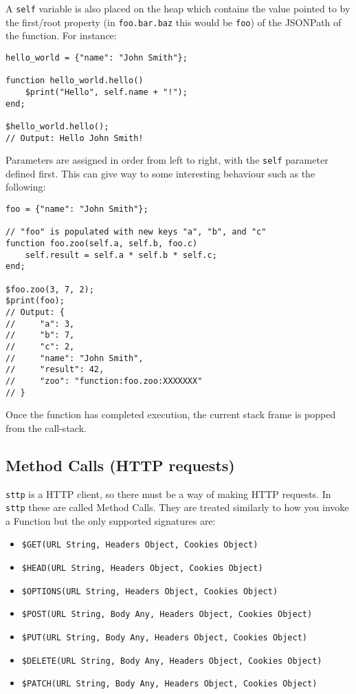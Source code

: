 A \verb|self| variable is also placed on the heap which contains the value pointed to by the first/root property (in \verb|foo.bar.baz| this would be \verb|foo|) of the JSONPath of the function. For instance:

\begin{verbatim}
hello_world = {"name": "John Smith"};

function hello_world.hello()
    $print("Hello", self.name + "!");
end;

$hello_world.hello();
// Output: Hello John Smith!
\end{verbatim}

Parameters are assigned in order from left to right, with the \verb|self| parameter defined first. This can give way to some interesting behaviour such as the following:

\begin{verbatim}
foo = {"name": "John Smith"};

// "foo" is populated with new keys "a", "b", and "c"
function foo.zoo(self.a, self.b, foo.c)
    self.result = self.a * self.b * self.c;
end;

$foo.zoo(3, 7, 2);
$print(foo);
// Output: {
//     "a": 3,
//     "b": 7,
//     "c": 2,
//     "name": "John Smith",
//     "result": 42,
//     "zoo": "function:foo.zoo:XXXXXXX"
// }
\end{verbatim}

Once the function has completed execution, the current stack frame is popped from the call-stack.

\subsection{Method Calls (HTTP requests)}

\verb|sttp| is a HTTP client, so there must be a way of making HTTP requests. In \verb|sttp| these are called Method Calls. They are treated similarly to how you invoke a Function but the only supported signatures are:

\begin{itemize}
    \item \verb|$GET(URL String, Headers Object, Cookies Object)|
    \item \verb|$HEAD(URL String, Headers Object, Cookies Object)|
    \item \verb|$OPTIONS(URL String, Headers Object, Cookies Object)|
    \item \verb|$POST(URL String, Body Any, Headers Object, Cookies Object)|
    \item \verb|$PUT(URL String, Body Any, Headers Object, Cookies Object)|
    \item \verb|$DELETE(URL String, Body Any, Headers Object, Cookies Object)|
    \item \verb|$PATCH(URL String, Body Any, Headers Object, Cookies Object)|
\end{itemize}

